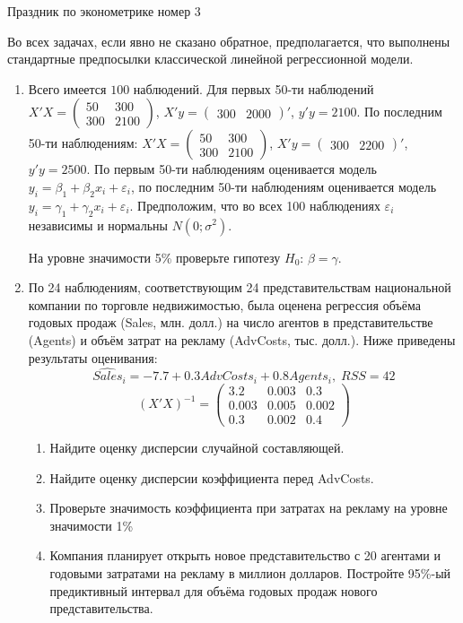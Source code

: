 \documentclass[12pt,a4paper]{article}
\newcommand{\e}{\varepsilon}
\begin{document}
Праздник по эконометрике номер 3 



Во всех задачах, если явно не сказано обратное, предполагается, что выполнены стандартные предпосылки классической линейной регрессионной модели. 

\begin{enumerate}

\item  Всего имеется $100$ наблюдений. Для первых 50-ти наблюдений $X'X=\begin{pmatrix}
50 & 300 \\
300 & 2100
\end{pmatrix}$, $X'y=\begin{pmatrix}
300 & 2000
\end{pmatrix}'$, $y'y=2100$. По последним 50-ти наблюдениям: $X'X=\begin{pmatrix}
50 & 300 \\
300 & 2100
\end{pmatrix}$, $X'y=\begin{pmatrix}
300 & 2200
\end{pmatrix}'$, $y'y=2500$. По первым 50-ти наблюдениям оценивается модель $y_i = \beta_1 + \beta_2 x_i + \e_i$, по последним 50-ти наблюдениям оценивается модель $y_i = \gamma_1 + \gamma_2 x_i + \e_i$. Предположим, что во всех 100 наблюдениях $\e_i$ независимы и нормальны $N(0;\sigma^2)$. 


На уровне значимости 5\% проверьте гипотезу $H_0: \, \beta=\gamma$.




\item По 24 наблюдениям, соответствующим 24 представительствам национальной компании по торговле недвижимостью, была оценена регрессия объёма годовых продаж (Sales, млн. долл.) на число агентов в представительстве (Agents) и объём затрат на рекламу (AdvCosts, тыс. долл.).
Ниже приведены результаты оценивания:
\[
\widehat{Sales}_i = -7.7 + 0.3 AdvCosts_i + 0.8Agents_i, \; RSS=42
\]
\[
(X'X)^{-1}=\begin{pmatrix}
3.2 & 0.003 & 0.3 \\
0.003& 0.005 & 0.002 \\
0.3 & 0.002 & 0.4
\end{pmatrix}
\]
\begin{enumerate}
\item Найдите оценку дисперсии случайной составляющей.
\item  Найдите оценку дисперсии коэффициента перед AdvCosts.
\item  Проверьте значимость коэффициента при затратах на рекламу на уровне значимости 1\%
\item Компания планирует открыть новое представительство с 20 агентами и годовыми затратами на рекламу в миллион долларов. Постройте 95\%-ый предиктивный интервал для объёма годовых продаж нового представительства.
\end{enumerate}


\end{enumerate}
\end{document}
